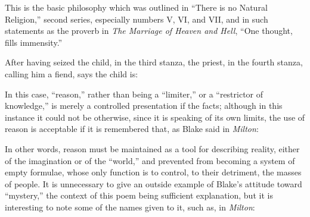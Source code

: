 
This is the basic philosophy\supercite{kazin:portable-blake}
which was outlined in \enquote{There is no Natural Religion,} second series,
especially numbers V, VI, and VII,\supercite{kazin:portable-blake}
and in such statements as the proverb in \emph{The Marriage of Heaven and Hell},\supercite{kazin:portable-blake}
\enquote{One thought, fills immensity.}

After having seized the child, in the third stanza, the priest, in the fourth stanza, calling him a fiend,
says the child is:


In this case, \enquote{reason,} rather than being a \enquote{limiter,} or a \enquote{restrictor of knowledge,} is merely a controlled presentation
if the facts; although in this instance it could not be otherwise, since it is speaking of its own limits, the use of reason is
acceptable if it is remembered that, as Blake said in \emph{Milton}:


In other words, reason must be maintained as a tool for describing reality, either of the imagination or of the \enquote{world,} and
prevented from becoming a system of empty formulae, whose only function is to control, to their detriment, the masses of people.
It is unnecessary to give an outside example of Blake's attitude toward \enquote{mystery,} the context of this poem being sufficient explanation,
but it is interesting to note some of the names given to it, such as, in \emph{Milton}:


